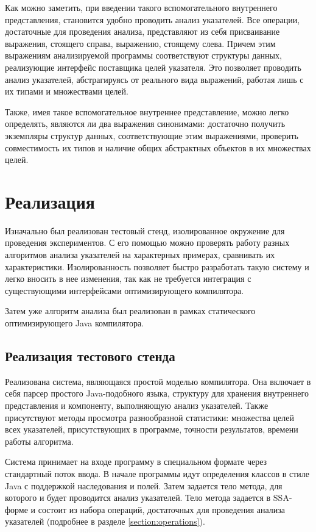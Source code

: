 \documentclass[14pt,titlepage]{extarticle}
\newcommand{\eng}[1]{{\English#1}}
\let\oldsection\section
\renewcommand{\section}{\newpage\oldsection}
\newcommand{\java}{\eng{Java}\xspace}
\begin{document}
      Как можно заметить, при введении такого вспомогательного внутреннего
      представления, становится удобно проводить анализ указателей.
      Все операции, достаточные для проведения анализа, представляют из себя
      присваивание выражения, стоящего справа, выражению, стоящему слева.
      Причем этим выражениям анализируемой программы соответствуют структуры
      данных, реализующие интерфейс поставщика целей указателя. Это позволяет
      проводить анализ указателей, абстрагируясь от реального вида выражений,
      работая лишь с их типами и множествами целей.

      Также, имея такое вспомогательное внутреннее представление, можно легко
      определять, являются ли два выражения синонимами: достаточно получить
      экземпляры структур данных, соответствующие этим выражениями, проверить
      совместимость их типов и наличие общих абстрактных объектов в их
      множествах целей.

  \section{Реализация}

    Изначально был реализован тестовый стенд, изолированное окружение для
    проведения экспериментов. С его помощью можно проверять работу
    разных алгоритмов анализа указателей на характерных примерах, сравнивать их
    характеристики. Изолированность позволяет быстро разработать такую систему
    и легко вносить в нее изменения, так как не требуется интеграция с
    существующими интерфейсами оптимизирующего компилятора.

    Затем уже алгоритм анализа был реализован в рамках статического
    оптимизирующего \java компилятора.

    \subsection{Реализация тестового стенда}

      Реализована система, являющаяся простой моделью компилятора. Она включает
      в себя парсер простого \java-подобного языка, структуру для хранения
      внутреннего представления и компоненту, выполняющую анализ указателей.
      Также присутствуют методы просмотра разнообразной статистики: множества
      целей всех указателей, присутствующих в программе, точности результатов,
      времени работы алгоритма.

      Система принимает на входе программу в специальном формате через
      стандартный поток ввода. В начале программы идут определения классов в
      стиле \java с поддержкой наследования и полей. Затем задается тело метода,
      для которого и будет проводится анализ указателей.
      Тело метода задается в SSA-форме и состоит из набора операций,
      достаточных для проведения анализа указателей (подробнее в разделе
      \ref{section:operations}).
\end{document}
